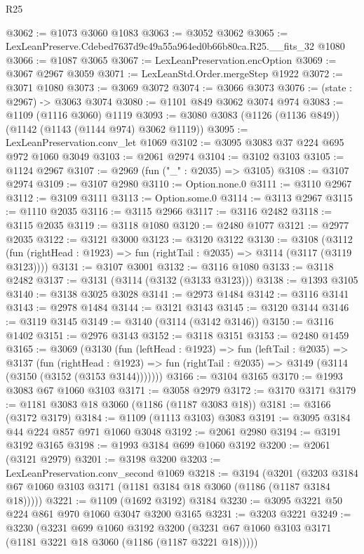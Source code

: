 \begin{lexlean}{R25}
\begin{coremodule}
@3062 := @1073 @3060 @1083
@3063 := @3052 @3062
@3065 := LexLeanPreserve.Cdebed7637d9c49a55a964ed0b66b80ca.R25.__fits_32 @1080
@3066 := @1087 @3065
@3067 := LexLeanPreservation.encOption
@3069 := @3067 @2967 @3059
@3071 := LexLeanStd.Order.mergeStep @1922
@3072 := @3071 @1080
@3073 := @3069 @3072
@3074 := @3066 @3073
@3076 := (state : @2967) -> @3063 @3074
@3080 := @1101 @849 @3062 @3074 @974
@3083 := @1109 (@1116 @3060) @1119
@3093 := @3080 @3083 (@1126 (@1136 @849)) (@1142 (@1143 (@1144 @974) @3062 @1119))
@3095 := LexLeanPreservation.conv_let @1069
@3102 := @3095 @3083 @37 @224 @695 @972 @1060 @3049
@3103 := @2061 @2974
@3104 := @3102 @3103
@3105 := @1124 @2967
@3107 := @2969 (fun ("_" : @2035) => @3105)
@3108 := @3107 @2974
@3109 := @3107 @2980
@3110 := Option.none.{0}
@3111 := @3110 @2967
@3112 := @3109 @3111
@3113 := Option.some.{0}
@3114 := @3113 @2967
@3115 := @1110 @2035
@3116 := @3115 @2966
@3117 := @3116 @2482
@3118 := @3115 @2035
@3119 := @3118 @1080
@3120 := @2480 @1077
@3121 := @2977 @2035
@3122 := @3121 @3000
@3123 := @3120 @3122
@3130 := @3108
    (@3112 (fun (rightHead : @1923) => fun (rightTail : @2035) => @3114 (@3117 (@3119 @3123))))
@3131 := @3107 @3001
@3132 := @3116 @1080
@3133 := @3118 @2482
@3137 := @3131 (@3114 (@3132 (@3133 @3123)))
@3138 := @1393 @3105
@3140 := @3138 @3025 @3028
@3141 := @2973 @1484
@3142 := @3116 @3141
@3143 := @2978 @1484
@3144 := @3121 @3143
@3145 := @3120 @3144
@3146 := @3119 @3145
@3149 := @3140 (@3114 (@3142 @3146))
@3150 := @3116 @1402
@3151 := @2976 @3143
@3152 := @3118 @3151
@3153 := @2480 @1459
@3165 := @3069
    (@3130
      (fun (leftHead : @1923) =>
      fun (leftTail : @2035) =>
      @3137
        (fun (rightHead : @1923) =>
        fun (rightTail : @2035) => @3149 (@3114 (@3150 (@3152 (@3153 @3144)))))))
@3166 := @3104 @3165
@3170 := @1993 @3083 @67 @1060 @3103
@3171 := @3058 @2979
@3172 := @3170 @3171
@3179 := @1181 @3083 @18 @3060 (@1186 (@1187 @3083 @18))
@3181 := @3166 (@3172 @3179)
@3184 := @1109 (@1113 @3103) @3083
@3191 := @3095 @3184 @44 @224 @857 @971 @1060 @3048
@3192 := @2061 @2980
@3194 := @3191 @3192 @3165
@3198 := @1993 @3184 @699 @1060 @3192
@3200 := @2061 (@3121 @2979)
@3201 := @3198 @3200
@3203 := LexLeanPreservation.conv_second @1069
@3218 := @3194
    (@3201 (@3203 @3184 @67 @1060 @3103 @3171 (@1181 @3184 @18 @3060 (@1186 (@1187 @3184 @18)))))
@3221 := @1109 (@1692 @3192) @3184
@3230 := @3095 @3221 @50 @224 @861 @970 @1060 @3047 @3200 @3165
@3231 := @3203 @3221
@3249 := @3230
    (@3231
      @699
      @1060
      @3192
      @3200
      (@3231 @67 @1060 @3103 @3171 (@1181 @3221 @18 @3060 (@1186 (@1187 @3221 @18)))))

\end{coremodule}
\end{lexlean}
